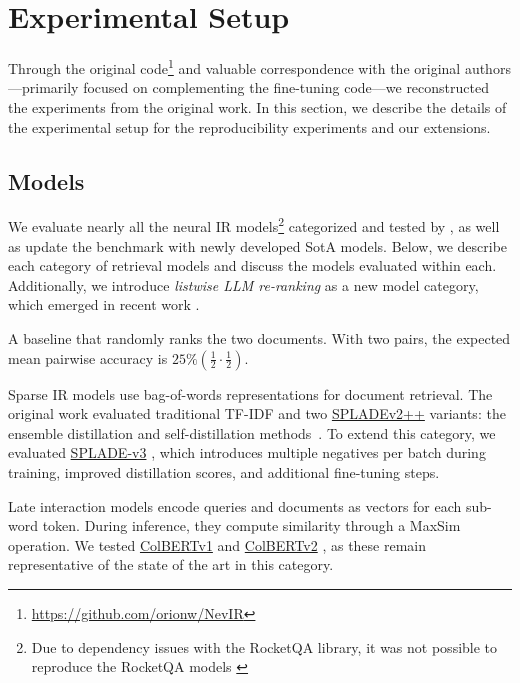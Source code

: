 \section{Experimental Setup}
Through the original code\footnote{\url{https://github.com/orionw/NevIR}} and valuable correspondence with the original authors---primarily focused on complementing the fine-tuning code---we reconstructed the experiments from the original work. In this section, we describe the details of the experimental setup for the reproducibility experiments and our extensions.


\subsection{Models} \label{model_description}
We evaluate nearly all the neural IR models\footnote{Due to dependency issues with the RocketQA library, it was not possible to reproduce the RocketQA models \cite{qu-etal-2021-rocketqa}} categorized and tested by \citet{weller2024nevirnegationneuralinformation}, as well as update the benchmark with newly developed SotA models. Below, we describe each category of retrieval models and discuss the models evaluated within each. Additionally, we introduce \textit{listwise LLM re-ranking} as a new model category, which emerged in recent work \cite{rankGPT, rankLLM, FIRST}.

A baseline that randomly ranks the two documents. With two pairs, the expected mean pairwise accuracy is \( 25\% \left(\frac{1}{2} \cdot \frac{1}{2}\right) \).

Sparse IR models use bag-of-words representations for document retrieval. The original work evaluated traditional TF-IDF and two \url{SPLADEv2++} variants: the ensemble distillation and self-distillation methods~\cite{formal2022distillation, lassance2022efficiency}. To extend this category, we evaluated \url{SPLADE-v3} \cite{spladev3}, which introduces multiple negatives per batch during training, improved distillation scores, and additional fine-tuning steps.

Late interaction models encode queries and documents as vectors for each sub-word token. During inference, they compute similarity through a MaxSim operation. We tested \url{ColBERTv1} \cite{colbertv1} and \url{ColBERTv2} \cite{santhanam2021colbertv2}, as these remain representative of the state of the art in this category.

